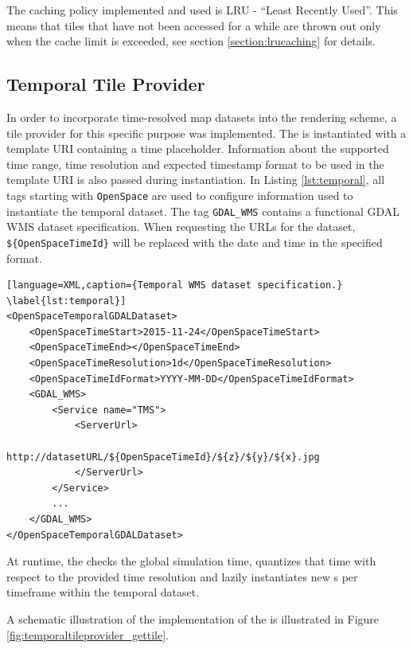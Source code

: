 The caching policy implemented and used is LRU - ``Least Recently Used''. This means that tiles that have not been accessed for a while are thrown out only when the cache limit is exceeded, see section \ref{section:lrucaching} for details.

\subsection{Temporal Tile Provider}
In order to incorporate time-resolved map datasets into the rendering scheme, a tile provider for this specific purpose was implemented. The  is instantiated with a template URI containing a time placeholder. Information about the supported time range, time resolution and expected timestamp format to be used in the template URI is also passed during instantiation. In Listing \ref{lst:temporal}, all tags starting with \texttt{OpenSpace} are used to configure information used to instantiate the temporal dataset. The tag \texttt{GDAL\_WMS} contains a functional GDAL WMS dataset specification. When requesting the URLs for the dataset, \texttt{\$\{OpenSpaceTimeId\}} will be replaced with the date and time in the specified format.

\begin{lstlisting}[language=XML,caption={Temporal WMS dataset specification.} \label{lst:temporal}]
<OpenSpaceTemporalGDALDataset>
    <OpenSpaceTimeStart>2015-11-24</OpenSpaceTimeStart>
    <OpenSpaceTimeEnd></OpenSpaceTimeEnd>
    <OpenSpaceTimeResolution>1d</OpenSpaceTimeResolution>
    <OpenSpaceTimeIdFormat>YYYY-MM-DD</OpenSpaceTimeIdFormat>
    <GDAL_WMS>
        <Service name="TMS">
            <ServerUrl>
                http://datasetURL/${OpenSpaceTimeId}/${z}/${y}/${x}.jpg 
            </ServerUrl>
        </Service>
        ...
    </GDAL_WMS>
</OpenSpaceTemporalGDALDataset>
\end{lstlisting}

At runtime, the  checks the global simulation time, quantizes that time with respect to the provided time resolution and lazily instantiates new s per timeframe within the temporal dataset. 

A schematic illustration of the implementation of the  is illustrated in Figure \ref{fig:temporaltileprovider_gettile}.

